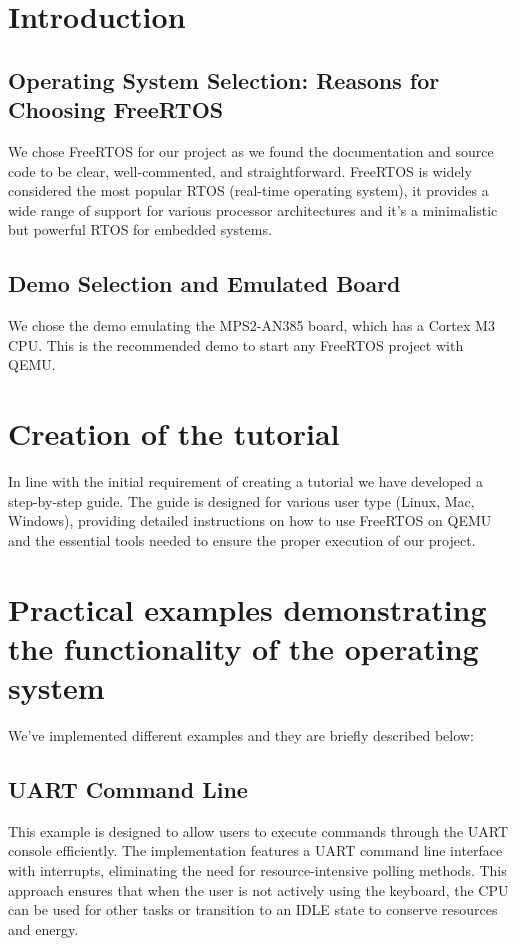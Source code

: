 \section{Introduction}

\subsection{Operating System Selection: Reasons for Choosing FreeRTOS}
We chose FreeRTOS for our project as we found the documentation and source code to be clear, well-commented, and straightforward. FreeRTOS is widely considered the most popular RTOS (real-time operating system), it provides a wide range of support for various processor architectures and it's a minimalistic but powerful RTOS for embedded systems.
\subsection{Demo Selection and Emulated Board}
We chose the demo emulating the MPS2-AN385 board, which has a Cortex M3 CPU. This is the recommended demo to start any FreeRTOS project with QEMU.



\section{Creation of the tutorial}
In line with the initial requirement of creating a tutorial we have developed a step-by-step guide. 
The guide is designed for various user type (Linux, Mac, Windows), providing detailed instructions on how to use FreeRTOS on QEMU and the essential tools needed to ensure the proper execution of our project.



\section{Practical examples demonstrating the functionality of the operating system}
We've implemented different examples and they are briefly described below:
\subsection{UART Command Line} \label{Uart Example}
This example is designed to allow users to execute commands through the UART console efficiently. 
The implementation features a UART command line interface with interrupts, eliminating the need for
resource-intensive polling methods. This approach ensures that when the user is not actively using the keyboard, the CPU can be used for
other tasks or transition to an IDLE state to conserve resources and
energy.

